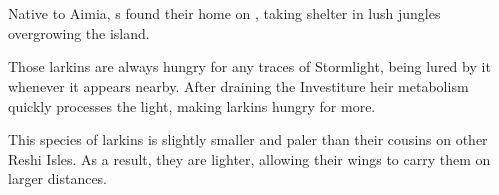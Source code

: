 \section{\enemyLarkinName{}}
\label{enemyLarkin}

Native to Aimia, \enemyLarkin{}s found their home on \theIsland{}, taking shelter in lush jungles overgrowing the island.

Those larkins are always hungry for any traces of Stormlight, being lured by it whenever it appears nearby. After draining the Investiture heir metabolism quickly processes the light, making larkins hungry for more.

This species of larkins is slightly smaller and paler than their cousins on other Reshi Isles. As a result, they are lighter, allowing their wings to carry them on larger distances. 
\\


